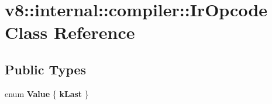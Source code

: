 \hypertarget{classv8_1_1internal_1_1compiler_1_1IrOpcode}{}\section{v8\+:\+:internal\+:\+:compiler\+:\+:Ir\+Opcode Class Reference}
\label{classv8_1_1internal_1_1compiler_1_1IrOpcode}
\subsection*{Public Types}
\begin{DoxyCompactItemize}
\item 
\mbox{\label{classv8_1_1internal_1_1compiler_1_1IrOpcode_a12e212665e666e61e7d32a0ae9a31e80}} 
enum {\bfseries Value} \{ {\bfseries k\+Last}
 \}
\end{DoxyCompactItemize}
